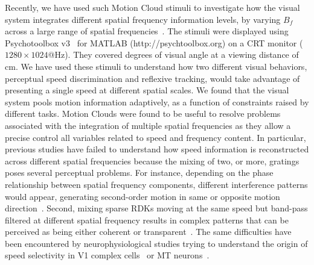 \documentclass[a4paper,11pt]{article}%
\begin{document}
Recently, we have used such Motion Cloud stimuli to investigate how the visual system integrates different spatial frequency information levels, by varying $B_{f}$ across a large range of spatial frequencies~\citep{Simoncini2012More}. The stimuli were displayed using Psychotoolbox v3~\citep{Pelli97,Brainard97} for MATLAB (http://psychtoolbox.org) on a CRT monitor ($1280\times1024$@\unit[100]{Hz}). They covered \unit[47]{degrees} of visual angle at a viewing distance of \unit[57]{cm}. We have used these stimuli to understand how two different visual behaviors, perceptual speed discrimination and reflexive tracking, would take advantage of presenting a single speed at different spatial scales. We found that the visual system pools motion information adaptively, as a function of constraints raised by different tasks. Motion Clouds were found to be useful to resolve problems associated with the integration of multiple spatial frequencies as they allow a precise control all variables related to speed and frequency content. In particular, previous studies have failed to understand how speed information is reconstructed across different spatial frequencies because the mixing of two, or more, gratings poses several perceptual problems. For instance, depending on the phase relationship between spatial frequency components, different interference patterns would appear, generating second-order motion in same or opposite motion direction~\citep{smith90}. Second, mixing sparse RDKs moving at the same speed but band-pass filtered at different spatial frequency results in complex patterns that can be perceived as being either coherent or transparent~\citep{watson94}. The same difficulties have been encountered by neurophysiological studies trying to understand the origin of speed selectivity in V1 complex cells~\citep{Priebe06} or MT neurons~\citep{Priebe03}. %
\end{document}
